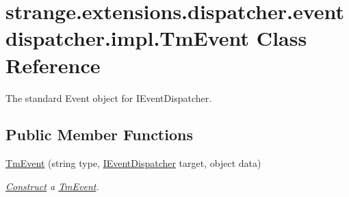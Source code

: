 \hypertarget{classstrange_1_1extensions_1_1dispatcher_1_1eventdispatcher_1_1impl_1_1_tm_event}{\section{strange.\-extensions.\-dispatcher.\-eventdispatcher.\-impl.\-Tm\-Event Class Reference}
\label{classstrange_1_1extensions_1_1dispatcher_1_1eventdispatcher_1_1impl_1_1_tm_event}
}


The standard Event object for I\-Event\-Dispatcher.  


\subsection*{Public Member Functions}
\begin{DoxyCompactItemize}
\item 
\hypertarget{classstrange_1_1extensions_1_1dispatcher_1_1eventdispatcher_1_1impl_1_1_tm_event_ab0677049edefda950cf5019c3a2a2142}{\hyperlink{classstrange_1_1extensions_1_1dispatcher_1_1eventdispatcher_1_1impl_1_1_tm_event_ab0677049edefda950cf5019c3a2a2142}{Tm\-Event} (string type, \hyperlink{interfacestrange_1_1extensions_1_1dispatcher_1_1eventdispatcher_1_1api_1_1_i_event_dispatcher}{I\-Event\-Dispatcher} target, object data)}\label{classstrange_1_1extensions_1_1dispatcher_1_1eventdispatcher_1_1impl_1_1_tm_event_ab0677049edefda950cf5019c3a2a2142}

\begin{DoxyCompactList}\small\item\em \hyperlink{class_construct}{Construct} a \hyperlink{classstrange_1_1extensions_1_1dispatcher_1_1eventdispatcher_1_1impl_1_1_tm_event}{Tm\-Event}. \end{DoxyCompactList}\end{DoxyCompactItemize}
